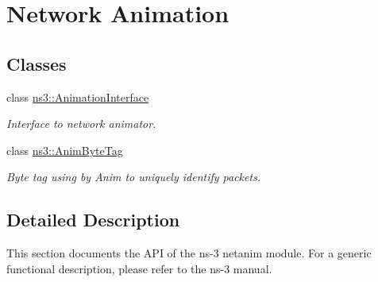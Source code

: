 \hypertarget{group__netanim}{}\section{Network Animation}
\label{group__netanim}
\subsection*{Classes}
\begin{DoxyCompactItemize}
\item 
class \hyperlink{classns3_1_1AnimationInterface}{ns3\+::\+Animation\+Interface}
\begin{DoxyCompactList}\small\item\em Interface to network animator. \end{DoxyCompactList}\item 
class \hyperlink{classns3_1_1AnimByteTag}{ns3\+::\+Anim\+Byte\+Tag}
\begin{DoxyCompactList}\small\item\em Byte tag using by Anim to uniquely identify packets. \end{DoxyCompactList}\end{DoxyCompactItemize}


\subsection{Detailed Description}
This section documents the A\+PI of the ns-\/3 netanim module. For a generic functional description, please refer to the ns-\/3 manual. 